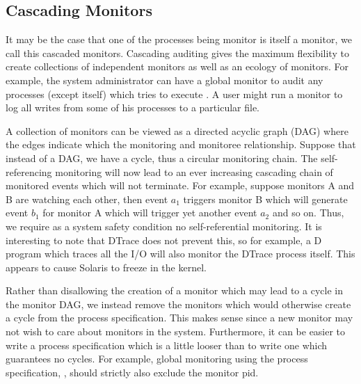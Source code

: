 \subsection{Cascading Monitors}
\label{sec:self}

It may be the case that one of the processes being monitor is
itself a monitor, we call this cascaded monitors.
Cascading auditing gives the maximum flexibility to create 
collections of independent monitors as well as an ecology
of monitors.
For example, the system administrator can have a global monitor to
audit any processes (except itself) which
tries to execute . 
A user might run a monitor to log all writes 
from some of his processes to a particular file.

A collection of monitors can be viewed as a directed acyclic graph (DAG)
where the edges indicate which the monitoring and monitoree relationship.
Suppose that instead of a DAG, we have a cycle, 
thus a circular monitoring chain. 
The self-referencing monitoring will now lead to an ever increasing cascading
chain of monitored events which will not terminate.
For example, suppose monitors A and B are watching each other, then
event $a_1$ triggers monitor B which will generate event $b_1$ for monitor
A which will trigger yet another event $a_2$ and so on.
Thus, we require as a system safety condition no self-referential monitoring.
It is interesting to note that DTrace does not prevent this, so for example,
a D program which traces all the  I/O will also monitor the DTrace
process itself. This appears to cause Solaris to freeze in the kernel.

Rather than disallowing the creation of a monitor which may lead to a cycle
in the monitor DAG, we instead remove the monitors which would otherwise
create a cycle from the process specification.
This makes sense since a new monitor may not wish to care about monitors
in the system. Furthermore, it can be easier to write a process specification
which is a little looser than to write one which guarantees no cycles.
For example, global monitoring using the process specification, ,
should strictly also exclude the monitor pid.


